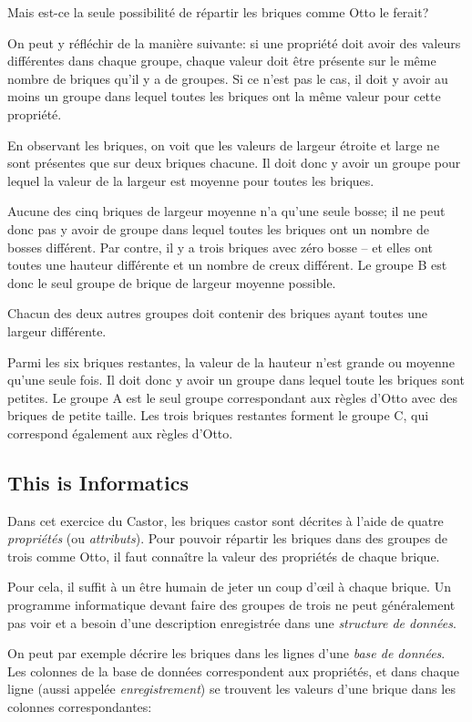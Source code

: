 \documentclass[a4paper,11pt]{report}
\begin{document}
Mais est-ce la seule possibilité de répartir les briques comme Otto le ferait?

On peut y réfléchir de la manière suivante: si une propriété doit avoir des valeurs différentes dans chaque groupe, chaque valeur doit être présente sur le même nombre de briques qu’il y a de groupes. Si ce n’est pas le cas, il doit y avoir au moins un groupe dans lequel toutes les briques ont la même valeur pour cette propriété.

En observant les briques, on voit que les valeurs de largeur étroite et large ne sont présentes que sur deux briques chacune. Il doit donc y avoir un groupe pour lequel la valeur de la largeur est moyenne pour toutes les briques.

Aucune des cinq briques de largeur moyenne n’a qu’une seule bosse; il ne peut donc pas y avoir de groupe dans lequel toutes les briques ont un nombre de bosses différent. Par contre, il y a trois briques avec zéro bosse – et elles ont toutes une hauteur différente et un nombre de creux différent. Le groupe B est donc le seul groupe de brique de largeur moyenne possible.

Chacun des deux autres groupes doit contenir des briques ayant toutes une largeur différente.

Parmi les six briques restantes, la valeur de la hauteur n’est grande ou moyenne qu’une seule fois. Il doit donc y avoir un groupe dans lequel toute les briques sont petites. Le groupe A est le seul groupe correspondant aux règles d’Otto avec des briques de petite taille. Les trois briques restantes forment le groupe C, qui correspond également aux règles d’Otto.


\subsection*{This is Informatics}

Dans cet exercice du Castor, les briques castor sont décrites à l’aide de quatre \emph{propriétés} (ou \emph{attributs}). Pour pouvoir répartir les briques dans des groupes de trois comme Otto, il faut connaître la valeur des propriétés de chaque brique.

Pour cela, il suffit à un être humain de jeter un coup d’œil à chaque brique. Un programme informatique devant faire des groupes de trois ne peut généralement pas voir et a besoin d’une description enregistrée dans une \emph{structure de données}.

On peut par exemple décrire les briques dans les lignes d’une \emph{base de données}. Les colonnes de la base de données correspondent aux propriétés, et dans chaque ligne (aussi appelée \emph{enregistrement}) se trouvent les valeurs d’une brique dans les colonnes correspondantes:
\end{document}
